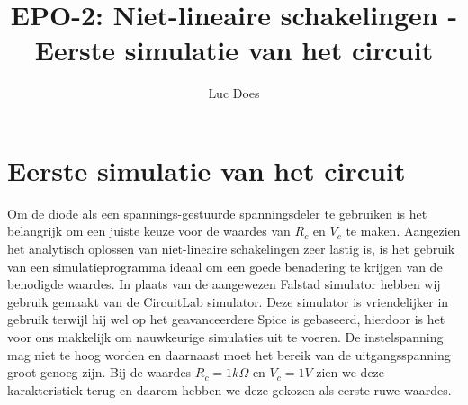 \documentclass{report}
\title{EPO-2: Niet-lineaire schakelingen - Eerste simulatie van het circuit}
\author{Luc Does}
\begin{document}
\chapter{Eerste simulatie van het circuit}
\label{ch:Eerste simulatie van het circuit}

Om de diode als een spannings-gestuurde spanningsdeler te gebruiken is het belangrijk om een juiste keuze voor de waardes van $R_c$ en $V_c$ te maken. Aangezien het analytisch oplossen van niet-lineaire schakelingen zeer lastig is, is het gebruik van een simulatieprogramma ideaal om een goede benadering te krijgen van de benodigde waardes. In plaats van de aangewezen Falstad simulator hebben wij gebruik gemaakt van de CircuitLab simulator. Deze simulator is vriendelijker in gebruik terwijl hij wel op het geavanceerdere  Spice is gebaseerd, hierdoor is het voor ons makkelijk om nauwkeurige simulaties uit te voeren.
\newline
De instelspanning mag niet te hoog worden en daarnaast moet het bereik van de uitgangsspanning groot genoeg zijn. Bij de waardes $R_c = 1k\Omega$ en $V_c = 1V$ zien we deze karakteristiek terug en daarom hebben we deze gekozen als eerste ruwe waardes.
\end{document}

